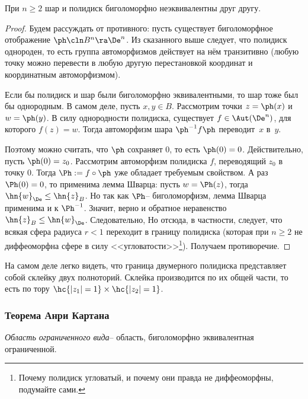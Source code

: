 \documentclass[a4paper]{article}
\begin{document}
\begin{theorem}
При $n \ge 2$ шар и полидиск биголоморфно неэквивалентны друг другу.
\end{theorem}
\begin{proof}
Будем рассуждать от противного: пусть существует биголоморфное отображение $\ph\cln B^n \ra \De^n$.
Из сказанного выше следует, что полидиск однороден, то есть
группа автоморфизмов действует на нём транзитивно (любую точку можно перевести в любую другую
перестановкой координат и координатным автоморфизмом).

Если бы полидиск и шар были биголоморфно эквивалентными, то шар тоже был бы однородным.
В самом деле, пусть $x, y \in B$. Рассмотрим точки $z = \ph(x)$ и $w = \ph(y)$. В силу однородности
полидиска, существует $f \in \Aut(\De^n)$, для которого $f(z) = w$. Тогда автоморфизм
шара $\ph^{-1} f \ph$ переводит~$x$ в~$y$.

Поэтому можно считать, что $\ph$ сохраняет $0$, то есть $\ph(0) = 0$. Действительно, пусть $\ph(0) = z_0$.
Рассмотрим автоморфизм полидиска $f$, переводящий $z_0$ в точку $0$. Тогда $\Ph := f \circ\ph$ уже обладает
требуемым свойством. А раз $\Ph(0) = 0$, то применима лемма Шварца: пусть $w = \Ph(z)$, тогда
$\hn{w}_\De \le \hn{z}_B$. Но так как $\Ph$-- биголоморфизм, лемма Шварца применима и к $\Ph^{-1}$.
Значит, верно и обратное неравенство $\hn{z}_B \le \hn{w}_\De$. Следовательно,
Но отсюда, в частности, следует, что всякая сфера радиуса $r < 1$ переходит в границу полидиска
(которая при $n\ge 2$ не диффеоморфна сфере в силу
<<угловатости>>\footnote{Почему полидиск угловатый, и почему они правда не диффеоморфны, подумайте сами.}).
Получаем противоречие.
\end{proof}

\begin{petit}
На самом деле легко видеть, что граница двумерного полидиска представляет собой склейку двух полноторий.
Склейка производится по их общей части, то есть по тору $\hc{|z_1|=1}\times \hc{|z_2|=1}$.
\end{petit}

\subsubsection{Теорема Анри Картана}

\begin{df}
\emph{Область ограниченного вида}-- область, биголоморфно эквивалентная ограниченной.
\end{df}
\end{document}
